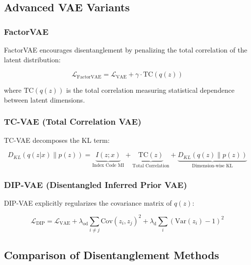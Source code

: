 \documentclass[conference]{IEEEtran}
\begin{document}
\subsection{Advanced VAE Variants}

\subsubsection{FactorVAE}

FactorVAE encourages disentanglement by penalizing the total correlation of the latent distribution:

\begin{equation}
\mathcal{L}_{\text{FactorVAE}} = \mathcal{L}_{\text{VAE}} + \gamma \cdot \text{TC}(q(z))
\end{equation}

where $\text{TC}(q(z))$ is the total correlation measuring statistical dependence between latent dimensions.

\subsubsection{TC-VAE (Total Correlation VAE)}

TC-VAE decomposes the KL term:

\begin{equation}
D_{KL}(q(z|x) \| p(z)) = \underbrace{I(z; x)}_{\text{Index Code MI}} + \underbrace{\text{TC}(z)}_{\text{Total Correlation}} + \underbrace{D_{KL}(q(z) \| p(z))}_{\text{Dimension-wise KL}}
\end{equation}

\subsubsection{DIP-VAE (Disentangled Inferred Prior VAE)}

DIP-VAE explicitly regularizes the covariance matrix of $q(z)$:

\begin{equation}
\mathcal{L}_{\text{DIP}} = \mathcal{L}_{\text{VAE}} + \lambda_{\text{od}} \sum_{i \neq j} \text{Cov}(z_i, z_j)^2 + \lambda_{\text{d}} \sum_{i} (\text{Var}(z_i) - 1)^2
\end{equation}

\subsection{Comparison of Disentanglement Methods}
\end{document}
